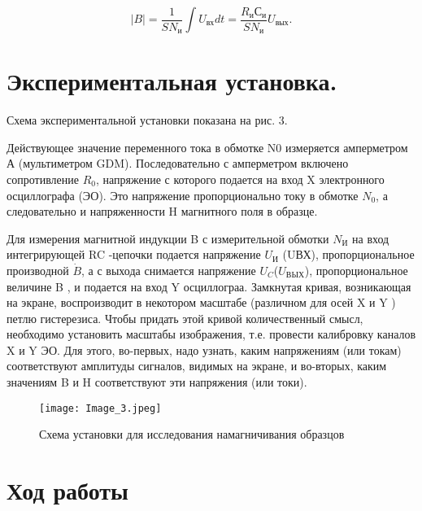 $$ |B|=\dfrac{1}{SN_{и}}\int U_{вх}dt=\dfrac{R_{и}С_{и}}{SN_{и}}U_{вых}.$$

\section{Экспериментальная установка.}
Схема экспериментальной установки показана на рис. 3.

Действующее значение переменного тока в обмотке N0 измеряется амперметром А (мультиметром GDM). Последовательно с амперметром включено сопротивление $R_{0}$, напряжение с которого подается на вход X электронного осциллографа (ЭО). Это напряжение пропорционально току в обмотке $N_{0}$, а следовательно и напряженности H магнитного поля в образце.

Для измерения магнитной индукции B с измерительной обмотки $N_{И}$ на вход интегрирующей RC -цепочки подается напряжение $U_{И}$ (UВХ), пропорциональное производной $\dot{B}$, а с выхода снимается напряжение $U_{C}$($U_{ВЫХ}$), пропорциональное
величине B , и подается на вход Y осциллограа.
Замкнутая кривая, возникающая на экране, воспроизводит в некотором масштабе (различном для осей X и Y ) петлю гистерезиса. Чтобы придать этой кривой количественный смысл, необходимо установить масштабы изображения, т.е. провести калибровку каналов X и Y ЭО. Для этого, во-первых, надо узнать, каким напряжениям (или токам) соответствуют амплитуды сигналов, видимых на экране, и во-вторых,  каким значениям B и H соответствуют эти напряжения
(или токи).

\begin{figure}[H]
	\centering
	\texttt{[image: Image\_3.jpeg]}
	\caption{Схема установки для исследования намагничивания образцов}
	\label{fig:Holl2}
\end{figure}

\section{Ход работы}

